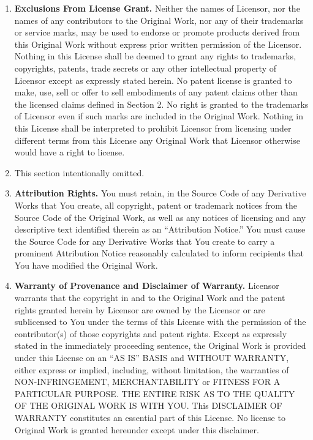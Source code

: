 \begin{it}
\begin{enumerate}
\item \textbf{Exclusions From License Grant.}  Neither the names of Licensor, nor the names of any 
      contributors to the Original Work, nor any of their trademarks or service marks, may 
	  be used to endorse or promote products derived from this Original Work without express prior 
	  written permission of the Licensor.  Nothing in this License shall be deemed to grant any 
	  rights to trademarks, copyrights, patents, trade secrets or any other intellectual property 
	  of Licensor except as expressly stated herein. No patent license is granted to make, use, 
	  sell or offer to sell embodiments of any patent claims other than the licensed claims 
	  defined in Section 2.  No right is granted to the trademarks of Licensor even if such marks 
	  are included in the Original Work. Nothing in this License shall be interpreted to prohibit 
	  Licensor from licensing under different terms from this License any Original Work that 
	  Licensor otherwise would have a right to license. 

\item This section intentionally omitted. 

\item \textbf{Attribution Rights.}  You must retain, in the Source Code of any Derivative Works that
      You create, all copyright, patent or trademark notices from the Source Code of the Original Work, 
	  as well as any notices of licensing and any descriptive text identified therein as an 
	  ``Attribution Notice.''  You must cause the Source Code for any Derivative Works that 
	  You create to carry a prominent Attribution Notice reasonably calculated to inform 
	  recipients that You have modified the Original Work. 

\item \textbf{Warranty of Provenance and Disclaimer of Warranty.}  Licensor warrants that the copyright in 
      and to the Original Work and the patent rights granted herein by Licensor are owned by the 
	  Licensor or are sublicensed to You under the terms of this License with the permission of 
	  the contributor(s) of those copyrights and patent rights.  Except as expressly stated in the 
	  immediately proceeding sentence, the Original Work is provided under this License on an 
	  ``AS IS'' BASIS and WITHOUT WARRANTY, either express or implied, including, without limitation, 
	  the warranties of NON-INFRINGEMENT, MERCHANTABILITY or FITNESS FOR A PARTICULAR PURPOSE. 
	  THE ENTIRE RISK AS TO THE QUALITY OF THE ORIGINAL WORK IS WITH YOU.  This DISCLAIMER OF WARRANTY 
	  constitutes an essential part of this License.  No license to Original Work is granted 
	  hereunder except under this disclaimer. 


\end{enumerate}
\end{it}
